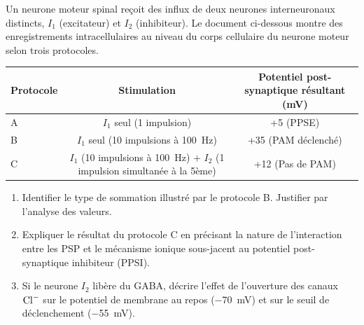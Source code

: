 \documentclass[11pt]{article}
\begin{document}
\begin{exercice}
Un neurone moteur spinal reçoit des influx de deux neurones interneuronaux distincts, $I_1$ (excitateur) et $I_2$ (inhibiteur). Le document ci-dessous montre des enregistrements intracellulaires au niveau du corps cellulaire du neurone moteur selon trois protocoles.

\begin{tabular}{lcc}
\toprule
Protocole & Stimulation & Potentiel post-synaptique résultant (mV) \\
\midrule
A & $I_1$ seul (1 impulsion) & +5 (PPSE) \\
B & $I_1$ seul (10 impulsions à \SI{100}{\hertz}) & +35 (PAM déclenché) \\
C & $I_1$ (10 impulsions à \SI{100}{\hertz}) + $I_2$ (1 impulsion simultanée à la 5ème) & +12 (Pas de PAM) \\
\bottomrule
\end{tabular}

\begin{enumerate}
    \item Identifier le type de sommation illustré par le protocole B. Justifier par l'analyse des valeurs.
    \item Expliquer le résultat du protocole C en précisant la nature de l'interaction entre les PSP et le mécanisme ionique sous-jacent au potentiel post-synaptique inhibiteur (PPSI).
    \item Si le neurone $I_2$ libère du GABA, décrire l'effet de l'ouverture des canaux $\ce{Cl-}$ sur le potentiel de membrane au repos (\SI{-70}{\milli\volt}) et sur le seuil de déclenchement (\SI{-55}{\milli\volt}).
\end{enumerate}
\end{exercice}
\end{document}
